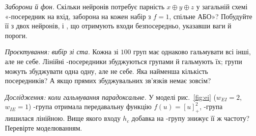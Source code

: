 \begin{exercise}[\lvlB]
\label{ex:03:6}
\emph{Заборони й фон.} Скільки нейронів потребує парність $x\oplus y\oplus z$ у загальній схемі «-посередник на вхід, заборона на кожен набір з $f=1$, спільне АБО»? Побудуйте її з двох нейронів,  і , що отримують входи безпосередньо, указавши ваги й пороги.
\end{exercise}

\begin{exercise}[\lvlC]
\label{ex:03:7}
\emph{Проєктування: вибір зі ста.} Кожна зі $100$ груп  має однаково гальмувати всі інші, але не себе. Лінійні -посередники збуджуються групами й гальмують їх; групи можуть збуджувати одна одну, але не себе. Яка найменша кількість посередників? А якщо прямих збуджувальних зв'язків немає зовсім?
\end{exercise}

\begin{exercise}[\lvlC]
\label{ex:03:8}
\emph{Дослідження: коли гальмування парадоксальне.} У моделі рис.~\ref{fig:ei} ($w_{EI}=2$, $w_{IE}=1$) -група отримала передавальну функцію $f(u)=[u]_+^2$, -група лишилася лінійною. Вище якого входу $h_c$ добавка на -групу знижує її ж частоту? Перевірте моделюванням.
\end{exercise}
